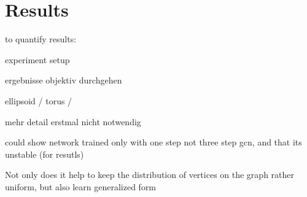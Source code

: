 \chapter{Results}
\label{sec:results}
to quantify results:

experiment setup

ergebnisse objektiv durchgehen

ellipsoid / torus /

mehr detail erstmal nicht notwendig

 could show network trained only with one step not three step gcn, and that its unstable (for resutls)

 Not only does it help to keep the distribution of vertices on the graph rather uniform, but also learn generalized form